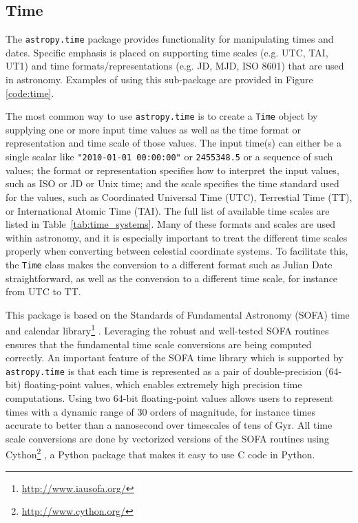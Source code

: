 \documentclass[traditabstract]{aa}
\begin{document}
\subsection{Time}

\label{sec:time}


The \texttt{astropy.time} package provides functionality for manipulating times
and dates. Specific emphasis is placed on supporting time scales (e.g. UTC,
TAI, UT1) and time formats/representations (e.g. JD, MJD, ISO 8601) that are
used in astronomy. Examples of using this sub-package are provided in Figure
\ref{code:time}.

The most common way to use \texttt{astropy.time} is to create a \texttt{Time}
object by supplying one or more input time values as well as the time
format or representation and time scale of those values. The input time(s) can
either be a single scalar like \verb|"2010-01-01 00:00:00"| or \verb|2455348.5|
or a sequence of such values; the format or representation specifies how to
interpret the input values, such as ISO or JD or Unix time; and the scale
specifies the time standard used for the values, such as Coordinated Universal
Time (UTC), Terrestial Time (TT), or International Atomic Time (TAI). The full
list of available time scales are listed in Table~\ref{tab:time_systems}. Many
of these formats and scales are used within astronomy, and it is especially
important to treat the different time scales properly when converting between
celestial coordinate systems. To facilitate this, the \texttt{Time} class makes
the conversion to a different format such as Julian Date straightforward, as
well as the conversion to a different time scale, for instance from UTC to TT.

This package is based on the Standards of Fundamental Astronomy (SOFA) time and
calendar library\footnote{\url{http://www.iausofa.org/}} \citep{sofa_wallace}.
Leveraging the robust and well-tested SOFA routines ensures that the
fundamental time scale conversions are being computed correctly. An important
feature of the SOFA time library which is supported by \texttt{astropy.time} is
that each time is represented as a pair of double-precision (64-bit)
floating-point values, which enables extremely high precision time
computations. Using two 64-bit floating-point values allows users to represent
times with a dynamic range of 30 orders of magnitude, for instance times
accurate to better than a nanosecond over timescales of tens of Gyr. All time
scale conversions are done by vectorized versions of the SOFA routines using
Cython\footnote{\url{http://www.cython.org/}} \citep{cython}, a Python package
that makes it easy to use C code in Python.
\end{document}
